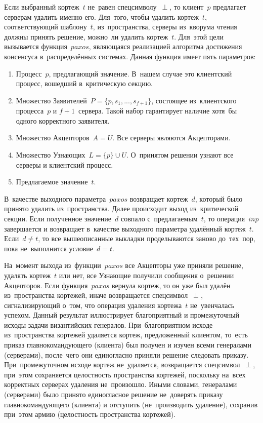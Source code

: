 Если выбранный кортеж~$t$ не~равен спецсимволу~$\perp$, то клиент~$p$ предлагает серверам удалить именно его. Для~того, чтобы удалить кортеж~$t$, соответствующий шаблону~$\bar{t}$, из~пространства, серверы из~кворума чтения должны принять решение, можно~ли удалить кортеж~$t$. Для~этой цели вызывается функция~$paxos$, являющаяся реализацией алгоритма достижения консенсуса в~распределённых системах. Данная функция имеет пять параметров: 
\begin{enumerate}
	\item Процесс~$p$, предлагающий значение. В~нашем случае это клиентский процесс, вошедший в~критическую секцию.
	\item Множество Заявителей~$P = \{p, s_1, ..., s_{f+1}\}$, состоящее из~клиентского процесса~$p$ и $f + 1$~сервера. Такой набор гарантирует наличие хотя~бы одного корректного заявителя.
	\item Множество Акцепторов~$A = U$. Все серверы являются Акцепторами.
	\item Множество Узнающих~$L = \{p\} \cup U$. О~принятом решении узнают все серверы и клиентский процесс.
	\item Предлагаемое значение~$t$.
\end{enumerate}

В~качестве выходного параметра~$paxos$ возвращает кортеж~$d$, который было принято удалить из~пространства. Далее происходит выход из~критической секции. Если полученное значение~$d$ совпало с~предлагаемым~$t$, то операция~$inp$ завершается и возвращает в~качестве выходного параметра удалённый кортеж~$t$. Если~$d \ne t$, то все вышеописанные выкладки проделываются заново до~тех~пор, пока не~выполнится условие~$d = t$.

На~момент выхода из~функции~$paxos$ все Акцепторы уже приняли решение, удалять кортеж~$t$ или нет, все Узнающие получили сообщения о~решении Акцепторов. Если функция~$paxos$ вернула кортеж, то он уже был удалён из~пространства кортежей, иначе возвращается спецсимвол~$\perp$, сигнализирующий о~том, что операция удаления кортежа~$t$ не~увенчалась успехом. Данный результат иллюстрирует благоприятный и промежуточный исходы задачи византийских генералов. При~благоприятном исходе из~пространства кортежей удаляется кортеж, предложенный клиентом, то~есть приказ главнокомандующего (клиента) был получен и изучен всеми генералами (серверами), после~чего они единогласно приняли решение следовать приказу. При~промежуточном исходе кортеж не~удаляется, возвращается спецсимвол~$\perp$, при~этом сохраняется целостность пространства кортежей, поскольку на~всех корректных серверах удаления не~произошло. Иными словами, генералами (серверами) было принято единогласное решение не~доверять приказу главнокомандующего (клиента) и отступить (не~производить удаление), сохранив при~этом армию (целостность пространства кортежей).

